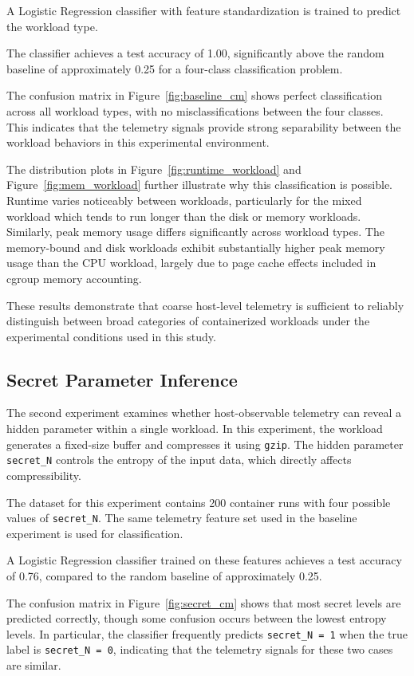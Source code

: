 \documentclass[11pt]{article}
\begin{document}
A Logistic Regression classifier with feature standardization is trained to predict the workload type.

The classifier achieves a test accuracy of 1.00, significantly above the random baseline of approximately 0.25 for a four-class classification problem.

The confusion matrix in Figure~\ref{fig:baseline_cm} shows perfect classification across all workload types, with no misclassifications between the four classes. This indicates that the telemetry signals provide strong separability between the workload behaviors in this experimental environment.

The distribution plots in Figure~\ref{fig:runtime_workload} and Figure~\ref{fig:mem_workload} further illustrate why this classification is possible. Runtime varies noticeably between workloads, particularly for the mixed workload which tends to run longer than the disk or memory workloads. Similarly, peak memory usage differs significantly across workload types. The memory-bound and disk workloads exhibit substantially higher peak memory usage than the CPU workload, largely due to page cache effects included in cgroup memory accounting.

These results demonstrate that coarse host-level telemetry is sufficient to reliably distinguish between broad categories of containerized workloads under the experimental conditions used in this study.

\subsection{Secret Parameter Inference}

The second experiment examines whether host-observable telemetry can reveal a hidden parameter within a single workload. In this experiment, the workload generates a fixed-size buffer and compresses it using \texttt{gzip}. The hidden parameter \texttt{secret\_N} controls the entropy of the input data, which directly affects compressibility.

The dataset for this experiment contains 200 container runs with four possible values of \texttt{secret\_N}. The same telemetry feature set used in the baseline experiment is used for classification.

A Logistic Regression classifier trained on these features achieves a test accuracy of 0.76, compared to the random baseline of approximately 0.25.

The confusion matrix in Figure~\ref{fig:secret_cm} shows that most secret levels are predicted correctly, though some confusion occurs between the lowest entropy levels. In particular, the classifier frequently predicts \texttt{secret\_N = 1} when the true label is \texttt{secret\_N = 0}, indicating that the telemetry signals for these two cases are similar.
\end{document}
